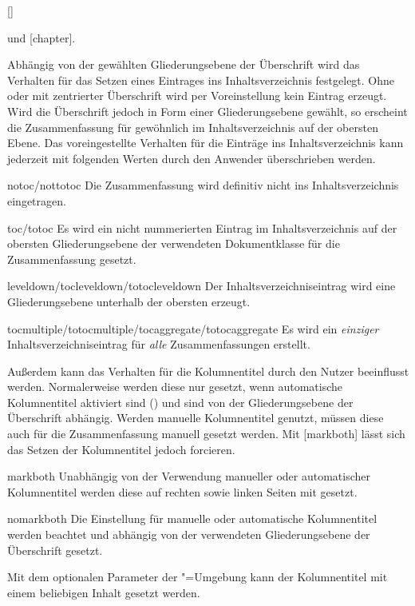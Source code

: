 \begin{Declaration}{[\PSet]}
\begin{values}
   und  [chapter].
\end{values}
%
Abhängig von der gewählten Gliederungsebene der Überschrift wird das Verhalten 
für das Setzen eines Eintrages ins Inhaltsverzeichnis festgelegt. Ohne oder mit 
zentrierter Überschrift wird per Voreinstellung kein Eintrag erzeugt. Wird die 
Überschrift jedoch in Form einer Gliederungsebene gewählt, so erscheint die 
Zusammenfassung für gewöhnlich im Inhaltsverzeichnis auf der obersten Ebene. 
Das voreingestellte Verhalten für die Einträge ins Inhaltsverzeichnis kann 
jederzeit mit folgenden Werten durch den Anwender überschrieben werden.
%
\begin{values}
\item[notoc/nottotoc]
  Die Zusammenfassung wird definitiv nicht ins Inhaltsverzeichnis eingetragen.
\item[toc/totoc]
  Es wird ein nicht nummerierten Eintrag im Inhaltsverzeichnis auf der obersten 
  Gliederungsebene der verwendeten Dokumentklasse für die Zusammenfassung 
  gesetzt.
\item[leveldown/tocleveldown/totocleveldown]
  Der Inhaltsverzeichniseintrag wird eine Gliederungsebene unterhalb der 
  obersten erzeugt.
\item[tocmultiple/totocmultiple/tocaggregate/totocaggregate]
  Es wird ein \emph{einziger} Inhaltsverzeichniseintrag für \emph{alle} 
  Zusammenfassungen erstellt.
\end{values}
%
Außerdem kann das Verhalten für die Kolumnentitel durch den Nutzer beeinflusst 
werden. Normalerweise werden diese nur gesetzt, wenn automatische Kolumnentitel 
aktiviert sind () und sind von der Gliederungsebene der 
Überschrift abhängig. Werden manuelle Kolumnentitel genutzt, müssen diese auch 
für die Zusammenfassung manuell gesetzt werden. Mit [markboth] 
lässt sich das Setzen der Kolumnentitel jedoch forcieren.
%
\begin{values}
\item[markboth]
  Unabhängig von der Verwendung manueller oder automatischer Kolumnentitel 
  werden diese auf rechten sowie linken Seiten mit  gesetzt.
\item[nomarkboth]
  Die Einstellung für manuelle oder automatische Kolumnentitel werden beachtet 
  und abhängig von der verwendeten Gliederungsebene der Überschrift gesetzt.
\end{values}
%
Mit dem optionalen Parameter  der 
"=Umgebung kann der Kolumnentitel mit einem beliebigen 
Inhalt gesetzt werden.


\end{Declaration}
